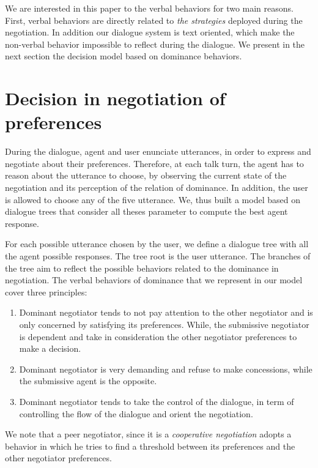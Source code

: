 \documentclass{llncs}
\begin{document}
\par We are interested in this paper to the verbal behaviors for two main reasons. First, verbal behaviors are directly related to \emph{the strategies} deployed during the negotiation. In addition our dialogue system is text oriented, which make the non-verbal behavior impossible to reflect during the dialogue. 
We present in the next section the decision model based on dominance behaviors.

\section{Decision in negotiation of preferences}
During the dialogue, agent and user enunciate utterances, in order to express and negotiate about their preferences. Therefore, at each talk turn, the agent has to reason about the utterance to choose, by observing  the current state of the negotiation and its perception of the relation of dominance. In addition, the user is allowed to choose any of the five utterance. We, thus built a model based on dialogue trees that consider all theses parameter to compute the best agent response. 

\par For each possible utterance chosen by the user, we define a dialogue tree with all the agent possible responses. The tree root is the user utterance. The branches of the tree aim to reflect the possible behaviors related to the dominance in negotiation. 
 The verbal behaviors of dominance that we represent in our model cover three principles:

\begin{enumerate}
	\item Dominant negotiator tends to not pay attention to the other negotiator and is only concerned by satisfying its preferences. While, the submissive negotiator is dependent and take in consideration the other negotiator preferences  to make a decision.
	\item Dominant negotiator is very demanding and  refuse to make concessions, while the submissive agent is the opposite.
	\item Dominant negotiator tends to take the control of the dialogue, in term of controlling the flow of the dialogue and orient the negotiation. 
\end{enumerate}

We note that a peer negotiator, since it is a \emph{cooperative negotiation} adopts a behavior in which he tries to find a threshold between its preferences and the other negotiator preferences.
\end{document}
